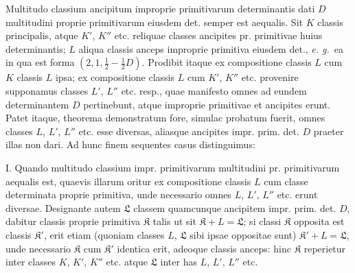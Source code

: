 Multitudo classium ancipitum improprie primitivarum determinantis dati $D$
multitudini proprie primitivarum eiusdem det. semper est aequalis. Sit $K$ classis
principalis, atque $K'$, $K''$ etc. reliquae classes ancipites pr. primitivae huius determinantis;
$L$ aliqua classis anceps improprie primitiva eiusdem det., \textit{e. g.}\ ea
in qua est forma $(2,1,\frac12-\frac12 D)$. Prodibit itaque ex compositione classis $L$ cum $K$
classis $L$ ipsa; ex compositione classis $L$ cum $K'$, $K''$ etc. provenire supponamus
classes $L'$, $L''$ etc. resp., quae manifesto omnes ad eundem determinantem
$D$ pertinebunt, atque improprie primitivae et ancipites erunt. Patet itaque,
theorema demonstratum fore, simulac probatum fuerit, omnes classes $L$, $L'$, $L''$
etc. esse diversas, aliasque ancipites impr. prim. det. $D$ praeter illas non dari.
Ad hunc finem sequentes casus distinguimus:

I. Quando multitudo classium impr. primitivarum multitudini pr. primitivarum
aequalis est, quaevis illarum oritur ex compositione classis $L$ cum classe
determinata proprie primitiva, unde necessario omnes $L$, $L'$, $L''$ etc. erunt diversae.
Designante autem $\mathfrak{L}$ classem quamcunque ancipitem impr. prim. det. $D$,
dabitur classis proprie primitiva $\mathfrak{K}$ talis ut sit $\mathfrak{K}+L=\mathfrak{L}$; si classi $\mathfrak{K}$ opposita
est classis $\mathfrak{K}'$, erit etiam (quoniam classes $L$, $\mathfrak{L}$ sibi ipsae oppositae sunt)
$\mathfrak{K}'+L=\mathfrak{L}$, unde necessario $\mathfrak{K}$ cum $\mathfrak{K}'$ identica erit, adeoque classis anceps:
hinc $\mathfrak{K}$ reperietur inter classes $K$, $K'$, $K''$ etc. atque $\mathfrak{L}$ inter has $L$, $L'$, $L''$ etc.


